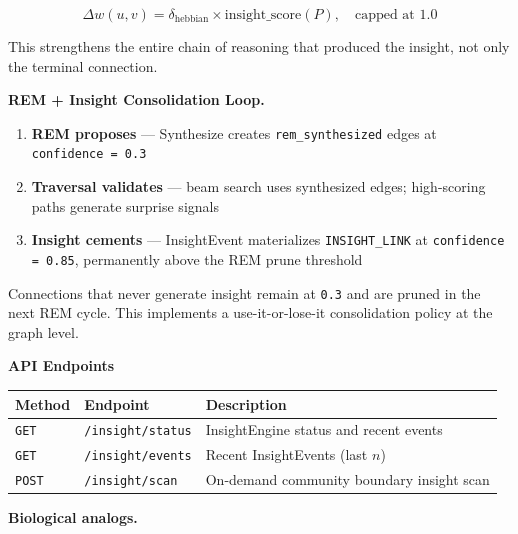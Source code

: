 \documentclass[10pt,journal,compsoc]{IEEEtran}
\begin{document}
\begin{equation}
\Delta w(u, v) = \delta_{\text{hebbian}} \times \text{insight\_score}(P), \quad \text{capped at } 1.0
\end{equation}

This strengthens the entire chain of reasoning that produced the insight, not only the terminal connection.

\textbf{REM + Insight Consol\-idation Loop.}

\begin{enumerate}
\item \textbf{REM proposes} — Synthesize creates \texttt{rem\_synthesized} edges at \texttt{confidence = 0.3}
\item \textbf{Traversal validates} — beam search uses synthesized edges; high-scoring paths generate surprise signals
\item \textbf{Insight cements} — InsightEvent mater\-ializes \texttt{INSIGHT\_LINK} at \texttt{confidence = 0.85}, permanently above the REM prune threshold

\end{enumerate}
Connections that never generate insight remain at \texttt{0.3} and are pruned in the next REM cycle. This implements a use-it-or-lose-it conso\-lidation policy at the graph level.

\textbf{API Endpoints}

\begin{center}
{\footnotesize
\begin{tabularx}{\columnwidth}{|>{\raggedright\arraybackslash}X|>{\raggedright\arraybackslash}X|>{\raggedright\arraybackslash}X|}
\hline
Method & Endpoint & Description \\ \hline
\texttt{GET} & \texttt{/insight/status} & InsightEngine status and recent events \\ \hline
\texttt{GET} & \texttt{/insight/events} & Recent InsightEvents (last $n$) \\ \hline
\texttt{POST} & \texttt{/insight/scan} & On-demand community boundary insight scan \\ \hline
\end{tabularx}
}
\end{center}

\textbf{Biological analogs.}
\end{document}

